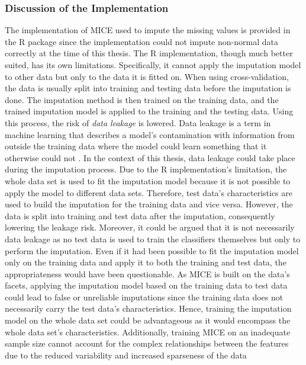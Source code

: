 \subsubsection{Discussion of the Implementation}
The implementation of MICE used to impute the missing values is provided in the 
R package  since the  implementation could not 
impute non-normal data correctly at the time of this thesis. The R 
implementation, though much better suited, has its own limitations. 
Specifically, it cannot apply the imputation model to other data but only to 
the data it is fitted on. 
When using cross-validation, the data is usually split into 
training and testing data before the imputation is done. The imputation method 
is then trained on the training data, and the trained imputation model is 
applied to the training and the testing data. Using this process, the 
risk of \textit{data leakage} is lowered.
Data leakage is a term in machine learning 
that describes a model's contamination with information from outside the 
training data where the model could learn something that it otherwise could not 
\cite{RN199}.
In the context of this thesis, data leakage could take place during the 
imputation process. Due to the R implementation's limitation, the whole 
data set is used to fit the imputation model because it is not possible to 
apply the model to different data sets. Therefore, test data's characteristics 
are used to build the imputation for the training data and vice 
versa. However, the data is split into training and test data after the 
imputation, consequently lowering the leakage risk. Moreover, it could be 
argued that it is not necessarily data leakage as no test data is used to train 
the classifiers themselves but only to perform the imputation.
Even if it had been possible to fit the imputation model only on the training 
data and apply it to both the training and test data, the appropriateness would 
have been questionable. As MICE is built on the data's facets, applying 
the imputation model based on the training data to test data could lead to 
false or unreliable imputations since the training data does not necessarily 
carry the test data's characteristics. Hence, training the imputation 
model on the whole data set could be advantageous as it would encompass the 
whole data set's characteristics. Additionally, training MICE on an inadequate 
sample size cannot account for the complex relationships between the 
features due to the reduced variability and increased sparseness of the data 

